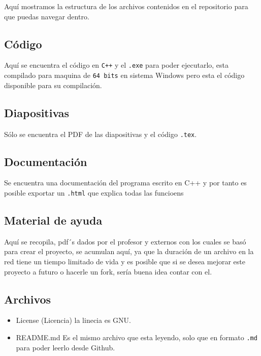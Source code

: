 \documentclass[
  spanish,
]{article}
\providecommand{\tightlist}{%
  \setlength{\itemsep}{0pt}\setlength{\parskip}{0pt}}
\begin{document}
Aquí mostramos la estructura de los archivos contenidos en el
repositorio para que puedas navegar dentro.

\hypertarget{cuxf3digo}{%
\subsection{Código}\label{cuxf3digo}}

Aquí se encuentra el código en \texttt{C++} y el \texttt{.exe} para
poder ejecutarlo, esta compilado para maquina de \texttt{64\ bits} en
sistema Windows pero esta el código disponible para su compilación.

\hypertarget{diapositivas}{%
\subsection{Diapositivas}\label{diapositivas}}

Sólo se encuentra el PDF de las diapositivas y el código \texttt{.tex}.

\hypertarget{documentaciuxf3n}{%
\subsection{Documentación}\label{documentaciuxf3n}}

Se encuentra una documentación del programa escrito en C++ y por tanto
es posible exportar un \texttt{.html} que explica todas las funcioens

\hypertarget{material-de-ayuda}{%
\subsection{Material de ayuda}\label{material-de-ayuda}}

Aquí se recopila, pdf´s dados por el profesor y externos con los cuales
se basó para crear el proyecto, se acumulan aquí, ya que la duración de
un archivo en la red tiene un tiempo limitado de vida y es posible que
si se desea mejorar este proyecto a futuro o hacerle un fork, sería
buena idea contar con el.

\hypertarget{archivos}{%
\subsection{Archivos}\label{archivos}}

\begin{itemize}
\tightlist
\item
  License (Licencia) la linecia es GNU.
\item
  README.md Es el mismo archivo que esta leyendo, solo que en formato
  \texttt{.md} para poder leerlo desde Github.
\end{itemize}
\end{document}
